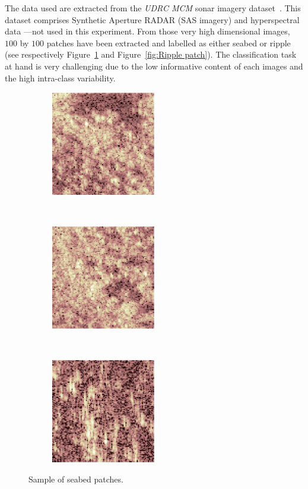 \documentclass[a4paper,11pt]{report}
\begin{document}
		The data used are extracted from the \textit{UDRC MCM} sonar imagery dataset~\citep{udrc2015sonar}. This dataset comprises Synthetic Aperture RADAR (SAS imagery) and hyperspectral data ---not used in this experiment. From those very high dimensional images, $100$ by $100$ patches have been extracted and labelled as either seabed or ripple (see respectively Figure~\ref{fig:Seabed patch} and Figure~\ref{fig:Ripple patch}). The classification task at hand is very challenging due to the low informative content of each images and the high intra-class variability.\\

		\begin{figure}[h]
			\centering
			\begin{subfigure}[t]{0.3\textwidth}
				\centering
				\includegraphics[height=1.8in]{patch_seabed_1.eps}
			\end{subfigure}%
			~ 
			\begin{subfigure}[t]{0.3\textwidth}
        \centering
        \includegraphics[height=1.8in]{patch_seabed_2.eps}
			\end{subfigure}
			~
			\begin{subfigure}[t]{0.3\textwidth}
        \centering
        \includegraphics[height=1.8in]{patch_seabed_3.eps}
			\end{subfigure}
			\caption{Sample of seabed patches.}
			\label{fig:Seabed patch}
		\end{figure}
		
\end{document}
